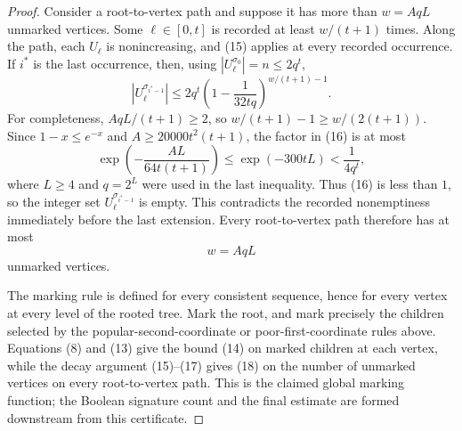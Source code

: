 \begin{proof}
Consider a root-to-vertex path and suppose it has more than
$w=AqL$ unmarked vertices.  Some $\ell\in[0,t]$ is recorded at least
$w/(t+1)$ times.  Along the path, each $U_\ell$ is nonincreasing, and (15)
applies at every recorded occurrence.  If $i^*$ is the last occurrence, then,
using $|U_\ell^{\sigma_0}|=n\leq2q^t$,
\[
 |U_\ell^{\sigma_{i^*-1}}|
 \leq2q^t\left(1-\frac1{32tq}\right)^{w/(t+1)-1}.              \tag{16}
\]
For completeness, $AqL/(t+1)\geq2$, so
$w/(t+1)-1\geq w/(2(t+1))$.  Since $1-x\leq e^{-x}$ and
$A\geq20000t^2(t+1)$, the factor in (16) is at most
\[
 \exp\left(-\frac{A L}{64t(t+1)}\right)
 \leq \exp(-300tL)<\frac1{4q^t},                            \tag{17}
\]
where $L\geq4$ and $q=2^L$ were used in the last inequality.  Thus (16) is
less than $1$, so the integer set $U_\ell^{\sigma_{i^*-1}}$ is empty.  This
contradicts the recorded nonemptiness immediately before the last extension.
Every root-to-vertex path therefore has at most
\[
                              w=AqL                         \tag{18}
\]
unmarked vertices.

The marking rule is defined for every consistent sequence, hence for every
vertex at every level of the rooted tree.  Mark the root, and mark precisely
the children selected by the popular-second-coordinate or poor-first-coordinate
rules above.  Equations (8) and (13) give the bound (14) on marked children at
each vertex, while the decay argument (15)--(17) gives (18) on the number of
unmarked vertices on every root-to-vertex path.  This is the claimed global
marking function; the Boolean signature count and the final estimate are
formed downstream from this certificate.
\end{proof}
